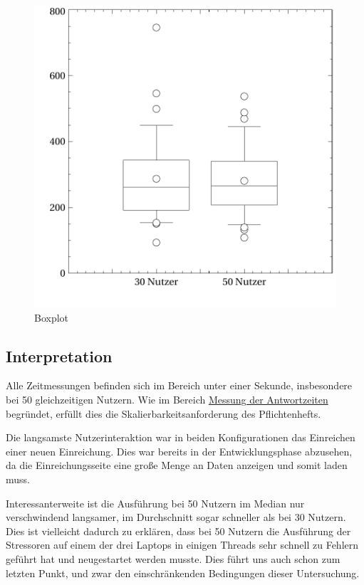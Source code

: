 \begin{figure}[H]
	\includegraphics[width=\linewidth]{graphics/boxplots.pdf}
	\caption{Boxplot}
	\label{fig:boxplot}	
\end{figure}


\subsection{Interpretation}

Alle Zeitmessungen befinden sich im Bereich unter einer Sekunde, insbesondere bei 50 gleichzeitigen Nutzern. Wie im Bereich \hyperref[sec:mess]{Messung der Antwortzeiten} begründet, erfüllt dies die Skalierbarkeitsanforderung des Pflichtenhefts.

Die langsamste Nutzerinteraktion war in beiden Konfigurationen das Einreichen einer neuen Einreichung. Dies war bereits in der Entwicklungsphase abzusehen, da die Einreichungsseite eine große Menge an Daten anzeigen und somit laden muss.

Interessanterweite ist die Ausführung bei 50 Nutzern im Median nur verschwindend langsamer, im Durchschnitt sogar schneller als bei 30 Nutzern. Dies ist vielleicht dadurch zu erklären, dass bei 50 Nutzern die Ausführung der Stressoren auf einem der drei Laptops in einigen Threads sehr schnell zu Fehlern geführt hat und neugestartet werden musste. Dies führt uns auch schon zum letzten Punkt, und zwar den einschränkenden Bedingungen dieser Untersuchung.

